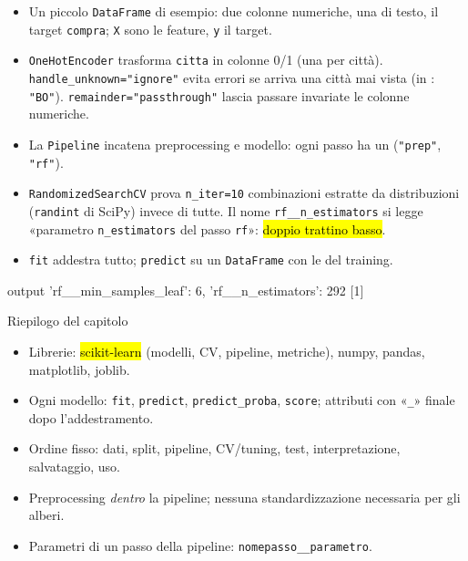 \begin{tecnica}[Spiegazione]
\begin{itemize}
  \item {} Un piccolo \texttt{DataFrame} di esempio: due colonne numeriche, una di testo, il target \texttt{compra}; \texttt{X} sono le feature, \texttt{y} il target.
  \item {} \texttt{OneHotEncoder} trasforma \texttt{citta} in colonne 0/1 (una per città). \texttt{handle\_unknown="ignore"} evita errori se arriva una città mai vista (in : \texttt{"BO"}). \texttt{remainder="passthrough"} lascia passare invariate le colonne numeriche.
  \item {} La \texttt{Pipeline} incatena preprocessing e modello: ogni passo ha un  (\texttt{"prep"}, \texttt{"rf"}).
  \item {} \texttt{RandomizedSearchCV} prova \texttt{n\_iter=10} combinazioni estratte da distribuzioni (\texttt{randint} di SciPy) invece di tutte. Il nome \texttt{rf\_\_n\_estimators} si legge «parametro \texttt{n\_estimators} del passo \texttt{rf}»: \hl{doppio trattino basso}.
  \item {} \texttt{fit} addestra tutto;  \texttt{predict} su un \texttt{DataFrame} con le  del training.
\end{itemize}
\end{tecnica}

\begin{terminale}{output}
{'rf__min_samples_leaf': 6, 'rf__n_estimators': 292}
[1]
\end{terminale}

\begin{appunti}{Riepilogo del capitolo}
\begin{itemize}
  \item Librerie: \hl{scikit-learn} (modelli, CV, pipeline, metriche), numpy, pandas, matplotlib, joblib.
  \item Ogni modello: \texttt{fit}, \texttt{predict}, \texttt{predict\_proba}, \texttt{score}; attributi con «\texttt{\_}» finale dopo l'addestramento.
  \item Ordine fisso: dati, split, pipeline, CV/tuning, test, interpretazione, salvataggio, uso.
  \item Preprocessing \emph{dentro} la pipeline; nessuna standardizzazione necessaria per gli alberi.
  \item Parametri di un passo della pipeline: \texttt{nomepasso\_\_parametro}.
\end{itemize}
\end{appunti}
